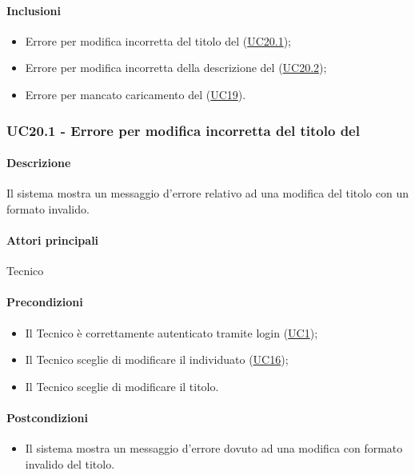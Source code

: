 \paragraph*{Inclusioni}
\begin{itemize}
    \item Errore per modifica incorretta del titolo del  (\hyperref[UC20point1]{UC20.1});
    \item Errore per modifica incorretta della descrizione del  (\hyperref[UC20point2]{UC20.2});
    \item Errore per mancato caricamento del  (\hyperref[UC19]{UC19}).
\end{itemize}


\subsubsection{UC20.1 - Errore per modifica incorretta del titolo del }\label{UC20point1}
\paragraph*{Descrizione}
Il sistema mostra un messaggio d’errore relativo ad una modifica del titolo con un formato invalido.

\paragraph*{Attori principali}
Tecnico

\paragraph*{Precondizioni}
\begin{itemize}
  \item Il Tecnico è correttamente autenticato tramite login (\hyperref[UC1]{UC1});
  \item Il Tecnico sceglie di modificare il  individuato (\hyperref[UC16]{UC16});
  \item Il Tecnico sceglie di modificare il titolo.
\end{itemize}

\paragraph*{Postcondizioni}
\begin{itemize}
  \item Il sistema mostra un messaggio d’errore dovuto ad una modifica con formato invalido del titolo.
\end{itemize}

